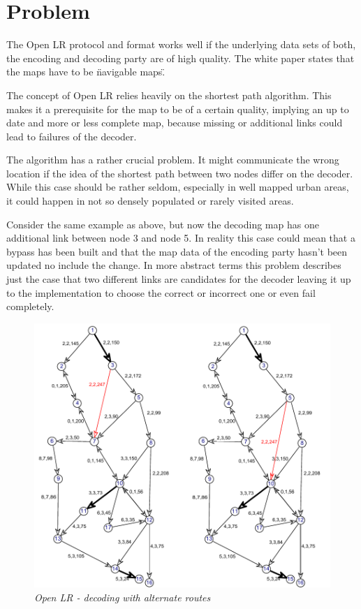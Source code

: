 \section{Problem} 
\label{sec:openlr-problem}

The Open LR protocol and format works well if the underlying data sets of both, the encoding and decoding party are of high quality. The white paper states that the maps have to be \"navigable maps\". 

The concept of Open LR relies heavily on the shortest path algorithm. This makes it a prerequisite for the map to be of a certain quality, implying an up to date and more or less complete map, because missing or additional links could lead to failures of the decoder. 

The algorithm has a rather crucial problem. It might communicate the wrong location if the idea of the shortest path between two nodes differ on the decoder. While this case should be rather seldom, especially in well mapped urban areas, it could happen in not so densely populated or rarely visited areas.

Consider the same example as above, but now the decoding map has one additional link between node 3 and node 5. In reality this case could mean that a bypass has been built and that the map data of the encoding party hasn't been updated no include the change. In more abstract terms this problem describes just the case that two different links are candidates for the decoder leaving it up to the implementation to choose the correct or incorrect one or even fail completely. 

\begin{figure}
  \includegraphics{fig/openlr-decoding-2.pdf}%
  \caption{\emph{Open LR - decoding with alternate routes}}%
  \label{fig:openlr-decoding-2}%
\end{figure}

